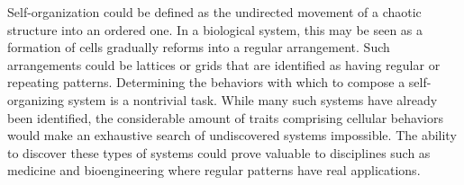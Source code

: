 Self-organization could be defined as the undirected movement of a chaotic structure into an ordered one. In a biological system, this may be seen as a formation of cells gradually reforms into a regular arrangement. Such arrangements could be lattices or grids that are identified as having regular or repeating patterns. Determining the behaviors with which to compose a self-organizing system is a nontrivial task. While many such systems have already been identified, the considerable amount of traits comprising cellular behaviors would make an exhaustive search of undiscovered systems impossible. The ability to discover these types of systems could prove valuable to disciplines such as medicine and bioengineering where regular patterns have real applications.
